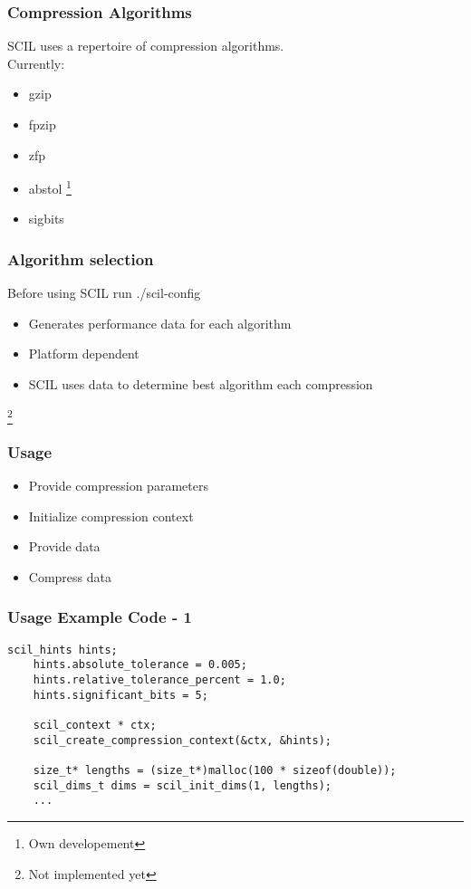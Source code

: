 \documentclass[compress]{beamer}
\begin{document}
\begin{frame}
	\frametitle{Compression Algorithms}

	SCIL uses a repertoire of compression algorithms.\\
	Currently:

	\bigskip

	\begin{itemize}
		\item gzip
		\item fpzip
		\item zfp
		\item abstol \footnote{Own developement}
		\item sigbits \footnotemark[\value{footnote}]
	\end{itemize}

	\setcounter{footnote}{0}
\end{frame}

\begin{frame}
	\frametitle{Algorithm selection}

	Before using SCIL run ./scil-config

	\bigskip

	\begin{itemize}
		\item Generates performance data for each algorithm
		\item Platform dependent
		\item SCIL uses data to determine best algorithm each compression
	\end{itemize}

	\footnote{Not implemented yet}
\end{frame}

\begin{frame}
	\frametitle{Usage}

	\begin{itemize}
		\item Provide compression parameters
		\item Initialize compression context
		\item Provide data
		\item Compress data
	\end{itemize}
\end{frame}

\begin{frame}[fragile]
	\frametitle{Usage Example Code - 1}

	\begin{lstlisting}[caption=SCIL usage example - 1]
	scil_hints hints;
	hints.absolute_tolerance = 0.005;
	hints.relative_tolerance_percent = 1.0;
	hints.significant_bits = 5;

	scil_context * ctx;
	scil_create_compression_context(&ctx, &hints);

	size_t* lengths = (size_t*)malloc(100 * sizeof(double));
	scil_dims_t dims = scil_init_dims(1, lengths);
	...
	\end{lstlisting}

\end{frame}
\end{document}
